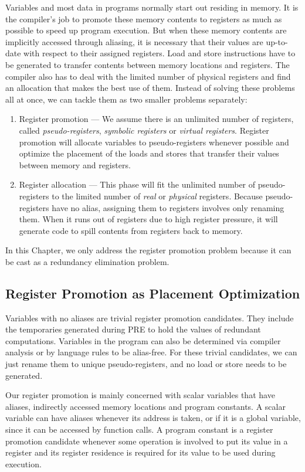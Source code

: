 Variables and most data in programs normally start out residing in memory.
It is the compiler's job to promote these memory contents to registers as
much as possible to speed up program execution.  But when these memory contents 
are implicitly accessed through aliasing, it is necessary that their values
are up-to-date with respect to their assigned registers.  Load and store
instructions have to be generated to transfer contents between memory locations
and registers.  The compiler also has to deal with the limited number of 
physical registers and find an allocation that makes the best use of them.  
Instead of solving these problems all at once, we can tackle them as two
smaller problems separately:
\begin{enumerate}
\item Register promotion --- We assume there is an unlimited number of 
registers, called \emph{pseudo-registers}, \emph{symbolic registers} or 
\emph{virtual registers}. Register promotion will allocate variables to
pseudo-registers whenever possible and optimize the placement of the loads
and stores that transfer their values between memory and registers.
\item Register allocation --- This phase will fit the unlimited number of
pseudo-registers to the limited number of \emph{real} or \emph{physical}
registers.  Because pseudo-registers have no alias, assigning them to registers
involves only renaming them.  When it runs out of registers due to high
register pressure, it will generate code to spill contents from registers
back to memory.
\end{enumerate}

In this Chapter, we only address the register promotion problem because it can
be cast as a redundancy elimination problem.

\subsection{Register Promotion as Placement Optimization}

Variables with no aliases are trivial register promotion candidates.  They
include the temporaries generated during PRE to hold the values of redundant 
computations.  Variables in the program can also be determined via compiler
analysis or by language rules to be alias-free.  For these trivial candidates,
we can just rename them to unique pseudo-registers, and no load or store needs
to be generated.  

Our register promotion is
mainly concerned with scalar variables that have aliases, indirectly accessed
memory locations and program constants.  A scalar variable can have aliases
whenever its address is taken, or if it is a global variable, since it can
be accessed by function calls.  A program constant is a register promotion
candidate whenever some operation is involved to put its value in a register and
its register residence is required for its value to be used during execution.

